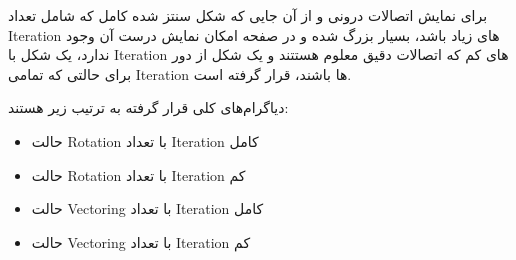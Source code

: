 \documentclass[12pt,titlepage,a4page , tikz , multi,table , svgnames,xcdraw]{article}
\begin{document}
برای نمایش اتصالات درونی و از آن جایی که شکل سنتز شده کامل که شامل تعداد Iteration های زیاد باشد، بسیار بزرگ شده و در صفحه امکان نمایش درست آن وجود ندارد، یک شکل با Iteration های کم که اتصالات دقیق معلوم هستتند و یک شکل از دور برای حالتی که تمامی Iteration ها باشند، قرار گرفته است.

دیاگرام‌های کلی قرار گرفته به ترتیب زیر هستند:


\begin{itemize}

\item
حالت Rotation با تعداد Iteration کامل

\item
حالت Rotation با تعداد Iteration کم

\item
حالت Vectoring با تعداد Iteration کامل

\item
حالت Vectoring با تعداد Iteration کم


\end{itemize}

\newpage

\begin{landscape}

\thispagestyle{empty}




\end{landscape}


\newpage

\begin{landscape}

\thispagestyle{empty}


\end{landscape}
\newpage



\begin{landscape}
\thispagestyle{empty}


\end{landscape}

\begin{landscape}
\thispagestyle{empty}


\end{landscape}

\begin{landscape}
\thispagestyle{empty}


\end{landscape}
\end{document}
